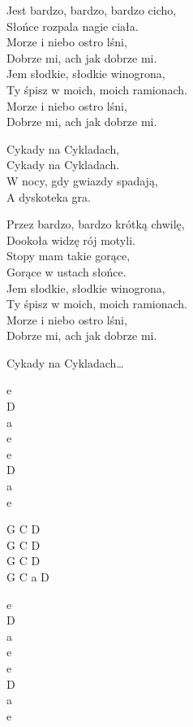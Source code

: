 \begin{text}
    Jest bardzo, bardzo, bardzo cicho,\\
    Słońce rozpala nagie ciała.\\
    Morze i niebo ostro lśni,\\
    Dobrze mi, ach jak dobrze mi.\\
    Jem słodkie, słodkie winogrona,\\
    Ty śpisz w moich, moich ramionach.\\
    Morze i niebo ostro lśni,\\
    Dobrze mi, ach jak dobrze mi.

    \vin Cykady na Cykladach,\\
    \vin Cykady na Cykladach.\\
    \vin W nocy, gdy gwiazdy spadają,\\
    \vin A dyskoteka gra.
    
    Przez bardzo, bardzo krótką chwilę,\\
    Dookoła widzę rój motyli.\\
    Stopy mam takie gorące,\\
    Gorące w ustach słońce.\\
    Jem słodkie, słodkie winogrona,\\
    Ty śpisz w moich, moich ramionach.\\
    Morze i niebo ostro lśni,\\
    Dobrze mi, ach jak dobrze mi.

    \vin Cykady na Cykladach…   
\end{text}
\begin{chord}
    e\\
    D\\
    a\\
    e\\
    e\\
    D\\
    a\\
    e

    G C D\\
    G C D\\
    G C D\\
    G C a D	

    e\\
    D\\
    a\\
    e\\
    e\\
    D\\
    a\\
    e
\end{chord}
